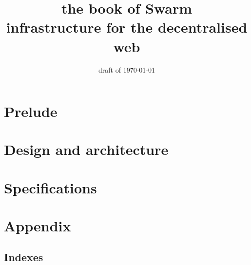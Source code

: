 \documentclass[a4paper,12pt,fullpage,openany,hyperfootnotes,hidelinks]{scrbook}
\title{\Huge\sc the book of Swarm\\
\Large infrastructure for the decentralised web}
\author{}
\date{draft of \today}
\theoremstyle{definition}
\begin{document}
\maketitle
\setcounter{tocdepth}{2}
\tableofcontents

\listoffigures


\part{Prelude} \label{part:preface}
 

\part{Design and architecture} \label{part:designarchitecture}

\part{Specifications} \label{part:specifications}


\cite{ethersphere2016smash}
\cite{ethersphere2016sw3}
\cite{maymounkov2002kademlia}
\cite{heep2010r}
  

\appendix
\part{Appendix} \label{part:appendix}


\chapter{Indexes}
\printglossary \label{sec:glossary}




\printglossary[nonumberlist=false, style=bookindex, title=Index] \label{sec:index}

\glsaddall %
\printglossary[type=\acronymtype,title={List of Acronyms}]
\end{document}
